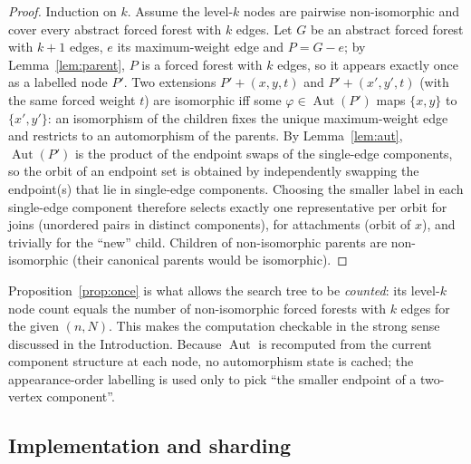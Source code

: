 \documentclass[11pt,a4paper]{article}
\theoremstyle{plain}
\theoremstyle{remark}
\newcommand{\Aut}{\operatorname{Aut}}
\begin{document}
\begin{proof}
Induction on $k$.  Assume the level-$k$ nodes are pairwise non-isomorphic and
cover every abstract forced forest with $k$ edges.  Let $G$ be an abstract
forced forest with $k+1$ edges, $e$ its maximum-weight edge and $P=G-e$; by
Lemma~\ref{lem:parent}, $P$ is a forced forest with $k$ edges, so it appears
exactly once as a labelled node $P'$.  Two extensions $P'+(x,y,t)$ and
$P'+(x',y',t)$ (with the same forced weight $t$) are isomorphic iff some
$\varphi\in\Aut(P')$ maps $\{x,y\}$ to $\{x',y'\}$: an isomorphism of the
children fixes the unique maximum-weight edge and restricts to an automorphism
of the parents.  By Lemma~\ref{lem:aut}, $\Aut(P')$ is the product of the
endpoint swaps of the single-edge components, so the orbit of an endpoint set is
obtained by independently swapping the endpoint(s) that lie in single-edge
components.  Choosing the smaller label in each single-edge component therefore
selects exactly one representative per orbit for joins (unordered pairs in
distinct components), for attachments (orbit of $x$), and trivially for the
``new'' child.  Children of non-isomorphic parents are non-isomorphic (their
canonical parents would be isomorphic).
\end{proof}

Proposition~\ref{prop:once} is what allows the search tree to be \emph{counted}:
its level-$k$ node count equals the number of non-isomorphic forced forests with
$k$ edges for the given $(n,N)$.  This makes the computation checkable in the
strong sense discussed in the Introduction.  Because $\Aut$ is recomputed from
the current component structure at each node, no automorphism state is cached;
the appearance-order labelling is used only to pick ``the smaller endpoint of a
two-vertex component''.

\subsection{Implementation and sharding}\label{sec:impl}
\end{document}
